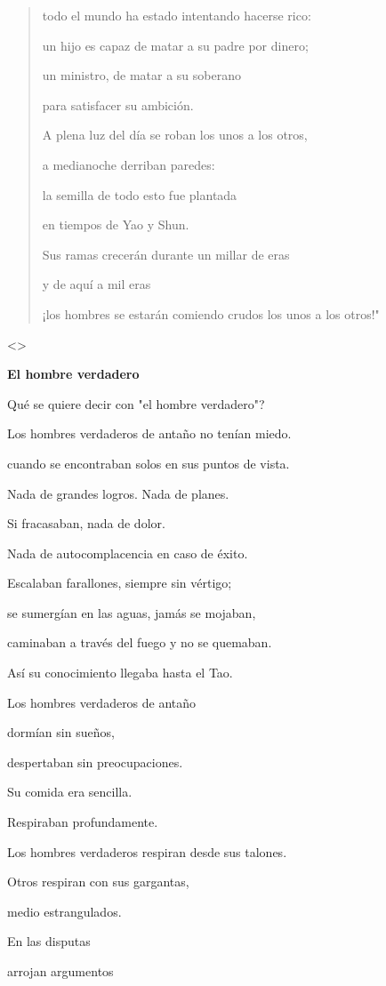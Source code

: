 \begin{quote}
todo el mundo ha estado intentando hacerse rico:

un hijo es capaz de matar a su padre por dinero;

un ministro, de matar a su soberano

para satisfacer su ambición.

A plena luz del día se roban los unos a los otros,

a medianoche derriban paredes:

la semilla de todo esto fue plantada

en tiempos de Yao y Shun.

Sus ramas crecerán durante un millar de eras

y de aquí a mil eras

¡los hombres se estarán comiendo crudos los unos a los otros!"
\end{quote}

\textless\textgreater{}

\textbf{{El hombre verdadero}}

Qué se quiere decir con "el hombre verdadero"?

Los hombres verdaderos de antaño no tenían miedo.

cuando se encontraban solos en sus puntos de vista.

Nada de grandes logros. Nada de planes.

Si fracasaban, nada de dolor.

Nada de autocomplacencia en caso de éxito.

Escalaban farallones, siempre sin vértigo;

se sumergían en las aguas, jamás se mojaban,

caminaban a través del fuego y no se quemaban.

Así su conocimiento llegaba hasta el Tao.

Los hombres verdaderos de antaño

dormían sin sueños,

despertaban sin preocupaciones.

Su comida era sencilla.

Respiraban profundamente.

Los hombres verdaderos respiran desde sus talones.

Otros respiran con sus gargantas,

medio estrangulados.

En las disputas

arrojan argumentos

